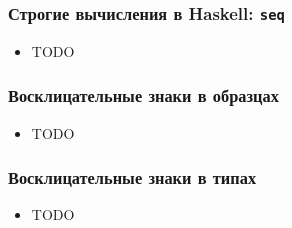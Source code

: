 \documentclass[11pt]{beamer}
\begin{document}
\begin{frame}[fragile]
\frametitle{Строгие вычисления в Haskell: \lstinline!seq!}
\begin{itemize}
\item TODO
\end{itemize}
\end{frame}

\begin{frame}[fragile]
\frametitle{Восклицательные знаки в образцах}
\begin{itemize}
\item TODO
\end{itemize}
\end{frame}

\begin{frame}[fragile]
\frametitle{Восклицательные знаки в типах}
\begin{itemize}
\item TODO
\end{itemize}
\end{frame}
\end{document}
